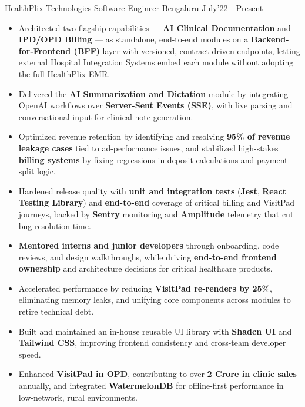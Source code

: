 \begin{cventries}

  \cventry
  {\href{https://healthplix.com/}{HealthPlix Technologies}}
  {Software Engineer}
  {Bengaluru}
  {July'22 - Present}
  {
    \begin{itemize}[leftmargin=*,itemsep=0.35mm,topsep=0.2mm,parsep=0.1mm,partopsep=0pt]
    \item Architected two flagship capabilities --- \textbf{AI Clinical Documentation} and \textbf{IPD/OPD Billing} --- as standalone, end-to-end modules on a \textbf{Backend-for-Frontend (BFF)} layer with versioned, contract-driven endpoints, letting external Hospital Integration Systems embed each module without adopting the full HealthPlix EMR.
    \item Delivered the \textbf{AI Summarization and Dictation} module by integrating OpenAI workflows over \textbf{Server-Sent Events (SSE)}, with live parsing and conversational input for clinical note generation.
    \item Optimized revenue retention by identifying and resolving \textbf{95\% of revenue leakage cases} tied to ad-performance issues, and stabilized high-stakes \textbf{billing systems} by fixing regressions in deposit calculations and payment-split logic.
    \item Hardened release quality with \textbf{unit and integration tests} (\textbf{Jest}, \textbf{React Testing Library}) and \textbf{end-to-end} coverage of critical billing and VisitPad journeys, backed by \textbf{Sentry} monitoring and \textbf{Amplitude} telemetry that cut bug-resolution time.
    \item \textbf{Mentored interns and junior developers} through onboarding, code reviews, and design walkthroughs, while driving \textbf{end-to-end frontend ownership} and architecture decisions for critical healthcare products.
    \item Accelerated performance by reducing \textbf{VisitPad re-renders by 25\%}, eliminating memory leaks, and unifying core components across modules to retire technical debt.
    \item Built and maintained an in-house reusable UI library with \textbf{Shadcn UI} and \textbf{Tailwind CSS}, improving frontend consistency and cross-team developer speed.
    \item Enhanced \textbf{VisitPad in OPD}, contributing to over \textbf{2 Crore in clinic sales} annually, and integrated \textbf{WatermelonDB} for offline-first performance in low-network, rural environments.
\end{itemize}
}


\end{cventries}
